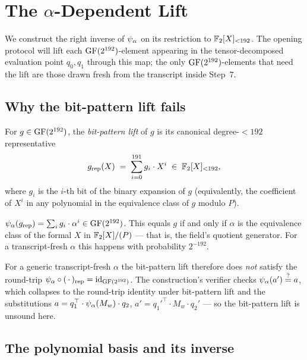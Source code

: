 \section{The $\alpha$-Dependent Lift}
\label{sec:lift}

We construct the right inverse of $\psi_{\alpha}$ on its restriction to
$\mathbb{F}_2[X]_{<192}$. The opening protocol will lift each
$\mathrm{GF}(2^{192})$-element appearing in the tensor-decomposed evaluation point
$q_0, q_1$ through this map; the only $\mathrm{GF}(2^{192})$-elements that need the
lift are those drawn fresh from the transcript inside Step~7.

\subsection{Why the bit-pattern lift fails}

\begin{definition}
\label{def:bitlift}
For $g \in \mathrm{GF}(2^{192})$, the \emph{bit-pattern lift} of $g$ is its canonical
degree-$<192$ representative
\[
  g_{\mathrm{rep}}(X) \;=\; \sum_{i=0}^{191} g_i \cdot X^i \;\in\; \mathbb{F}_2[X]_{<192},
\]
where $g_i$ is the $i$-th bit of the binary expansion of $g$
(equivalently, the coefficient of $X^i$ in any polynomial in the
equivalence class of $g$ modulo $P$).
\end{definition}

\begin{remark}
\label{rem:bit-pattern-failure}
$\psi_{\alpha}(g_{\mathrm{rep}}) = \sum_i g_i \cdot \alpha^i \in \mathrm{GF}(2^{192})$. This
equals $g$ if and only if $\alpha$ is the equivalence class of the
formal $X$ in $\mathbb{F}_2[X]/(P)$ — that is, the field's quotient generator.
For a transcript-fresh $\alpha$ this happens with probability
$2^{-192}$.
\end{remark}

For a generic transcript-fresh $\alpha$ the bit-pattern lift therefore
does \emph{not} satisfy the round-trip $\psi_{\alpha} \circ (\,\cdot\,)_{\mathrm{rep}}
= \mathrm{id}_{\mathrm{GF}(2^{192})}$. The construction's verifier checks
$\psi_{\alpha}(a') \stackrel{?}{=} a$, which collapses to the round-trip identity
under bit-pattern lift and the substitutions
$a = q_1^\top \cdot \psi_{\alpha}(M_w) \cdot q_2$,
$a' = q_1'^\top \cdot M_w \cdot q_2'$ — so the bit-pattern lift is
unsound here.

\subsection{The polynomial basis and its inverse}

